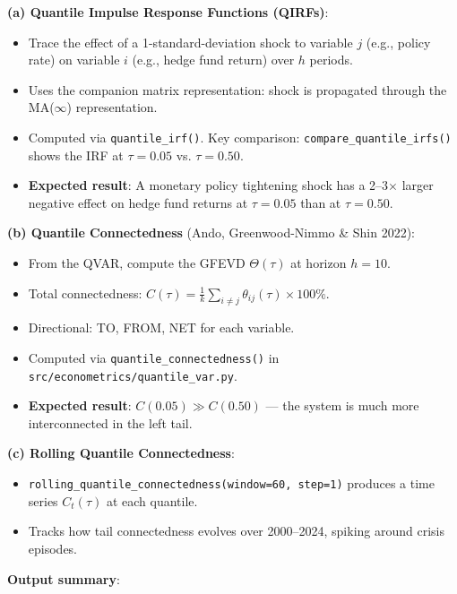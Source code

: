 \documentclass[11pt,a4paper]{article}
\begin{document}
\textbf{(a) Quantile Impulse Response Functions (QIRFs)}:
\begin{itemize}
\item Trace the effect of a 1-standard-deviation shock to variable $j$ (e.g., policy rate) on variable $i$ (e.g., hedge fund return) over $h$ periods.
\item Uses the companion matrix representation: shock is propagated through the MA($\infty$) representation.
\item Computed via \texttt{quantile\_irf()}. Key comparison: \texttt{compare\_quantile\_irfs()} shows the IRF at $\tau = 0.05$ vs. $\tau = 0.50$.
\item \textbf{Expected result}: A monetary policy tightening shock has a 2--3$\times$ larger negative effect on hedge fund returns at $\tau = 0.05$ than at $\tau = 0.50$.

\end{itemize}
\textbf{(b) Quantile Connectedness} (Ando, Greenwood-Nimmo \& Shin 2022):
\begin{itemize}
\item From the QVAR, compute the GFEVD $\Theta(\tau)$ at horizon $h = 10$.
\item Total connectedness: $C(\tau) = \frac{1}{k}\sum_{i \neq j} \theta_{ij}(\tau) \times 100\%$.
\item Directional: TO, FROM, NET for each variable.
\item Computed via \texttt{quantile\_connectedness()} in \texttt{src/econometrics/quantile\_var.py}.
\item \textbf{Expected result}: $C(0.05) \gg C(0.50)$ --- the system is much more interconnected in the left tail.

\end{itemize}
\textbf{(c) Rolling Quantile Connectedness}:
\begin{itemize}
\item \texttt{rolling\_quantile\_connectedness(window=60, step=1)} produces a time series $C_t(\tau)$ at each quantile.
\item Tracks how tail connectedness evolves over 2000--2024, spiking around crisis episodes.

\end{itemize}
\textbf{Output summary}:
\end{document}
